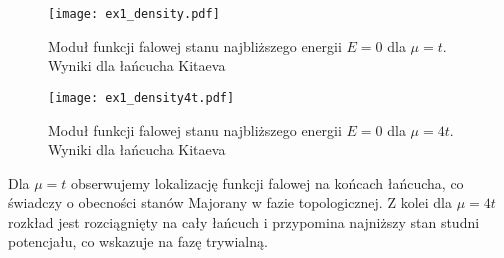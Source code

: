 \documentclass{article}
\begin{document}
\begin{figure}[htp!]
    \centering
    \texttt{[image: ex1\_density.pdf]}
    \caption{Moduł funkcji falowej stanu najbliższego energii $E=0$ dla $\mu=t$. Wyniki dla łańcucha Kitaeva}
    \label{fig:ex1-density}
\end{figure}
\begin{figure}[htp!]
    \centering
    \texttt{[image: ex1\_density4t.pdf]}
    \caption{Moduł funkcji falowej stanu najbliższego energii $E =0$ dla $\mu=4t$. Wyniki dla łańcucha Kitaeva}
    \label{fig:ex1-density4t}
\end{figure}
Dla $\mu = t$ obserwujemy lokalizację funkcji falowej na końcach łańcucha, co świadczy o obecności stanów Majorany w fazie topologicznej. 
Z kolei dla $\mu = 4t$ rozkład jest rozciągnięty na cały łańcuch i przypomina najniższy stan studni potencjału, co wskazuje na fazę trywialną.
\end{document}
